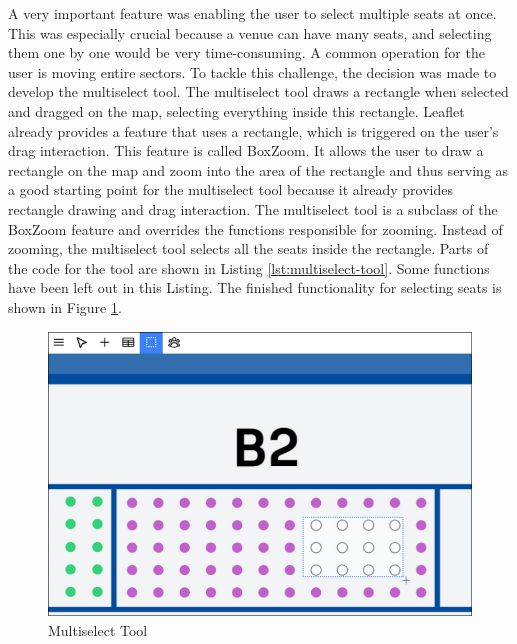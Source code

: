 A very important feature was enabling the user to select multiple seats at once. This was especially crucial because a venue can have many seats, and selecting them one by one would be very time-consuming. A common operation for the user is moving entire sectors. To tackle this challenge, the decision was made to develop the multiselect tool. The multiselect tool draws a rectangle when selected and dragged on the map, selecting everything inside this rectangle. Leaflet already provides a feature that uses a rectangle, which is triggered on the user's drag interaction. This feature is called BoxZoom. It allows the user to draw a rectangle on the map and zoom into the area of the rectangle and thus serving as a good starting point for the multiselect tool because it already provides rectangle drawing and drag interaction. The multiselect tool is a subclass of the BoxZoom feature and overrides the functions responsible for zooming. Instead of zooming, the multiselect tool selects all the seats inside the rectangle. Parts of the code for the tool are shown in Listing \ref{lst:multiselect-tool}. Some functions have been left out in this Listing. The finished functionality for selecting seats is shown in Figure \ref{fig:multiselect-tool}.
\begin{figure}[H]
    \centering
    \includegraphics[scale=0.3]{pics/multiselect.png}
    \caption{Multiselect Tool}
    \label{fig:multiselect-tool}
\end{figure}

